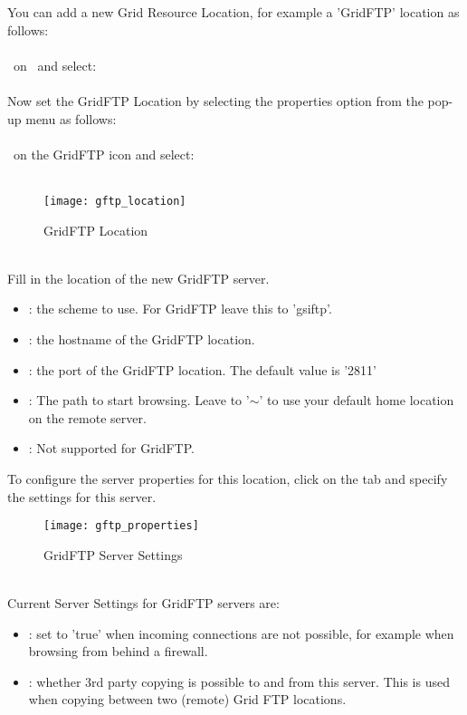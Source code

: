 You can add a new Grid Resource Location, for example a 'GridFTP' location as
follows:\\
\\
\step \rightclick\ on \myvle\ and select: \rarr {}\\
\\
Now set the GridFTP Location by selecting the properties
option from the pop-up menu as follows: \\
\\
\step \rightclick\ on the GridFTP icon and select:\\
\\
\begin{figure}[htbp]
\centerline{\texttt{[image: gftp\_location]}}
\caption{GridFTP Location}
\label{fig:gftp_location}
\end{figure}
\\
Fill in the location of the new GridFTP server.
\\
\begin{itemize}
\item {} : the scheme to use. For GridFTP leave this to 'gsiftp'.
\item {}  : the hostname of the GridFTP location. 
\item {}  : the port of the GridFTP location. The default value is
'2811'
\item {}  : The path to start browsing. Leave to '$\sim$' to use
your default home location on the remote server. 
\item {}  : Not supported for GridFTP. 
\end{itemize}

To configure the server properties for this location, click on the  tab and specify the settings for this server. 
\\
\begin{figure}[htbp]
\centerline{\texttt{[image: gftp\_properties]}}
\caption{GridFTP Server Settings}
\label{fig:gftp_properties}
\end{figure}
\\
Current Server Settings for GridFTP servers are:
\begin{itemize}
\item {} : set to 'true' when incoming connections are not
possible, for example when browsing from behind a firewall. 
\item {} : whether 3rd party copying is possible to and from
this server.  This is used when copying between two (remote) Grid FTP locations.  
\end{itemize}

